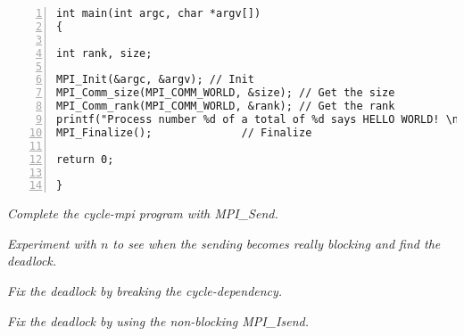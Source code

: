 \documentclass{article}
\begin{document}
\begin{lstlisting}[basicstyle=\small\sffamily,
keywords={break,case,const,continue,default,else,enum,
for,if,return,switch,while,do,long,void,int,float,double,
char,struct,typedef,include,size\_t},
keywordstyle={\color{blue}},
comment={[l]{//}}, morecomment={[s]{/*}{*/}}, commentstyle=\itshape,
columns={[l]flexible}, numbers=left, numberstyle=\tiny,
frameround=fftt, frame=shadowbox, captionpos=b,
caption={Your hello-world implementation.},
label=LST:hello]
int main(int argc, char *argv[])
{

int rank, size;

MPI_Init(&argc, &argv); // Init
MPI_Comm_size(MPI_COMM_WORLD, &size); // Get the size
MPI_Comm_rank(MPI_COMM_WORLD, &rank); // Get the rank
printf("Process number %d of a total of %d says HELLO WORLD! \n", rank, size); // Hello World
MPI_Finalize();              // Finalize

return 0;

}

\end{lstlisting}

\begin{ExerciseList}
\Exercise {}
  \Question \emph{Complete the cycle-mpi program with MPI\_Send.}

\Exercise
  \Question
  \emph{Experiment with $n$ to see when the sending
    becomes really blocking and find the deadlock.}

  \Question \emph{Fix the deadlock by breaking the cycle-dependency.}

  \Exercise
{}
  \Question \emph{Fix the deadlock by using the non-blocking MPI\_Isend.}

\end{ExerciseList}
\end{document}
